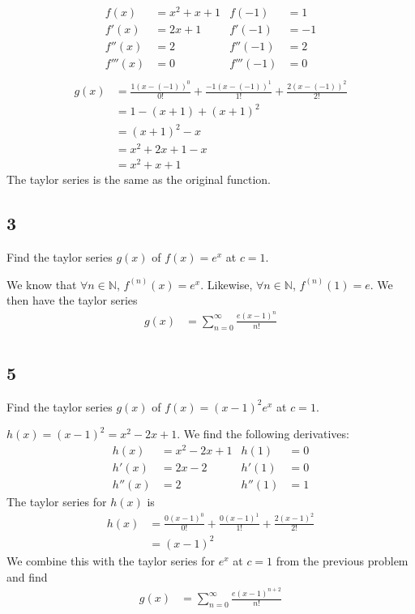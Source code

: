 \documentclass[12pt]{article}
\newcommand{\N}    [0]{\mathbb{N}                   }
\begin{document}
\begin{align*}
    f(x)    &= x^2 + x + 1 & f(-1)    &= 1  \\
    f'(x)   &= 2x + 1      & f'(-1)   &= -1 \\
    f''(x)  &= 2           & f''(-1)  &= 2  \\
    f'''(x) &= 0           & f'''(-1) &= 0  \\
\end{align*}
\begin{align*}
    g(x) &= \frac{1 (x-(-1))^0}{0!} + \frac{-1 (x-(-1))^1}{1!} + \frac{2 (x-(-1))^2}{2!} \\
    &= 1 - (x+1) + (x+1)^2 \\
    &= (x+1)^2 - x \\
    &= x^2 + 2x + 1 - x \\
    &= x^2 + x + 1
\end{align*}
The taylor series is the same as the original function.

\subsection*{3}
Find the taylor series $g(x)$ of $f(x) = e^x$ at $c=1$.

We know that $\forall n \in \N$, $f^{(n)}(x) = e^x$. Likewise, $\forall n \in \N$, $f^{(n)} (1) = e$. We then have the taylor series
\begin{align*}
    g(x) &= \sum_{n=0}^\infty \frac{e (x-1)^n}{n!} \\
\end{align*}

\subsection*{5}
Find the taylor series $g(x)$ of $f(x) = (x-1)^2 e^x$ at $c=1$.

$h(x) = (x-1)^2 = x^2 - 2x + 1$. We find the following derivatives:
\begin{align*}
    h(x)   &= x^2 - 2x + 1 & h(1)   &= 0 \\
    h'(x)  &= 2x - 2       & h'(1)  &= 0 \\
    h''(x) &= 2            & h''(1) &= 1
\end{align*}
The taylor series for $h(x)$ is
\begin{align*}
    h(x) &= \frac{0(x-1)^0}{0!} + \frac{0(x-1)^1}{1!} + \frac{2(x-1)^2}{2!} \\
         &= (x-1)^2
\end{align*}
We combine this with the taylor series for $e^x$ at $c=1$ from the previous problem and find
\begin{align*}
    g(x) &= \sum_{n=0}^\infty \frac{e(x-1)^{n+2}}{n!}
\end{align*}
\end{document}

